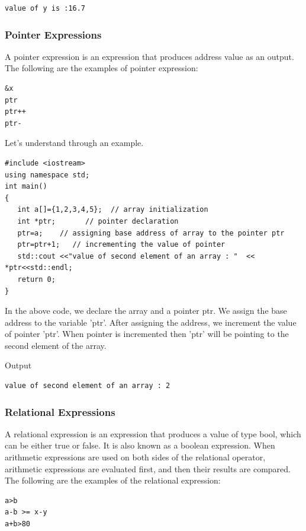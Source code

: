 \documentclass{book}
\begin{document}
\begin{Verbatim}
value of y is :16.7  
\end{Verbatim}

\subsubsection{Pointer Expressions}
A pointer expression is an expression that produces address value as an output. The following are the examples of pointer expression:

\begin{Verbatim}
&x  
ptr  
ptr++  
ptr-  
\end{Verbatim}

Let's understand through an example.

\begin{lstlisting}
#include <iostream>  
using namespace std;  
int main()  
{  
   int a[]={1,2,3,4,5};  // array initialization  
   int *ptr;       // pointer declaration  
   ptr=a;    // assigning base address of array to the pointer ptr  
   ptr=ptr+1;   // incrementing the value of pointer  
   std::cout <<"value of second element of an array : "  << *ptr<<std::endl;  
   return 0;  
}  
\end{lstlisting}

In the above code, we declare the array and a pointer ptr. We assign the base address to the variable 'ptr'. After assigning the address, we increment the value of pointer 'ptr'. When pointer is incremented then 'ptr' will be pointing to the second element of the array.

Output

\begin{lstlisting}
value of second element of an array : 2
\end{lstlisting}

\subsubsection{Relational Expressions}

A relational expression is an expression that produces a value of type bool, which can be either true or false. It is also known as a boolean expression. When arithmetic expressions are used on both sides of the relational operator, arithmetic expressions are evaluated first, and then their results are compared. The following are the examples of the relational expression:

\begin{lstlisting}
a>b  
a-b >= x-y  
a+b>80  
\end{lstlisting}
\end{document}
